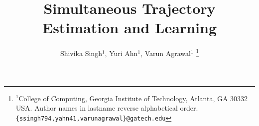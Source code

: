 \documentclass[letterpaper, 10 pt, conference]{ieeeconf}  %
\title{\LARGE \bf
    Simultaneous Trajectory Estimation and Learning
}
\author{Shivika Singh$^{1}$, Yuri Ahn$^{1}$, Varun Agrawal$^{1}$%
    \thanks{$^{1}$College of Computing, Georgia Institute of Technology, Atlanta, GA 30332 USA. Author names in lastname reverse alphabetical order.
        {\tt\small \{ssingh794,yahn41,varunagrawal\}@gatech.edu}}%
}
\begin{document}
    
    
    
    \maketitle
    \thispagestyle{empty}
    \pagestyle{empty}
    
    
    \begin{abstract}
    \end{abstract}
    
    
    
    
    
    
    
    
    
    
    
    \newpage
    \printbibliography
    
    
\end{document}
